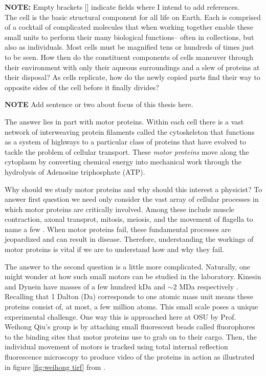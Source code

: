 \textbf{NOTE:} Empty brackets [] indicate fields where I intend to add references. \\

The cell is the basic structural component for all life on Earth. Each is comprised of a cocktail of complicated molecules that when working together enable these small units to perform their many biological functions-- often in collections, but also as individuals. Most cells must be magnified tens or hundreds of times just to be seen. How then do the constituent components of cells maneuver through their environment with only their aqueous surroundings and a slew of proteins at their disposal? As cells replicate, how do the newly copied parts find their way to opposite sides of the cell before it finally divides? 

\textbf{NOTE} Add sentence or two about focus of this thesis here.


The answer lies in part with motor proteins. Within each cell there is a vast network of interweaving protein filaments called the cytoskeleton that functions as a system of  highways to a particular class of proteins that have evolved to tackle the problem of cellular transport. These \textit{motor proteins} move along the cytoplasm by converting chemical energy into mechanical work through the hydrolysis of Adenosine triphosphate (ATP).

Why should we study motor proteins and why should this interest a physicist? To answer first question we need only consider the vast array of cellular processes in which motor proteins are critically involved. Among these include muscle contraction, axonal transprot, mitosis, meiosis, and the movement of flagella to name a few \cite{}. When motor proteins fail, these fundamental processes are jeopardized and can result in disease\cite{hirokawa_biochemical_2003}. Therefore, understanding the workings of motor proteins is vital if we are to understand how and why they fail. 

The answer to the second question is a little more complicated. Naturally, one might wonder at how such small motors can be studied in the laboratory. Kinesin and Dynein have masses of a few hundred kDa and  $\sim2$ MDa respectively \cite{liao_kinesin_1998, johnson_structure_1983}. Recalling that 1 Dalton (Da) corresponds to one atomic mass unit means these proteins consist of, at most, a few million atoms. This small scale poses a unique experimental challenge. One way this is approached here at OSU by Prof. Weihong Qiu's group is by attaching small fluorescent beads called fluorophores to the binding sites that motor proteins use to grab on to their cargo. Then, the individual movement of motors is tracked using total internal reflection fluorescence microscopy to produce video of the proteins in action as illustrated in figure \ref{fig:weihong tirf} from \cite{qiu_dynein_2012}. 

